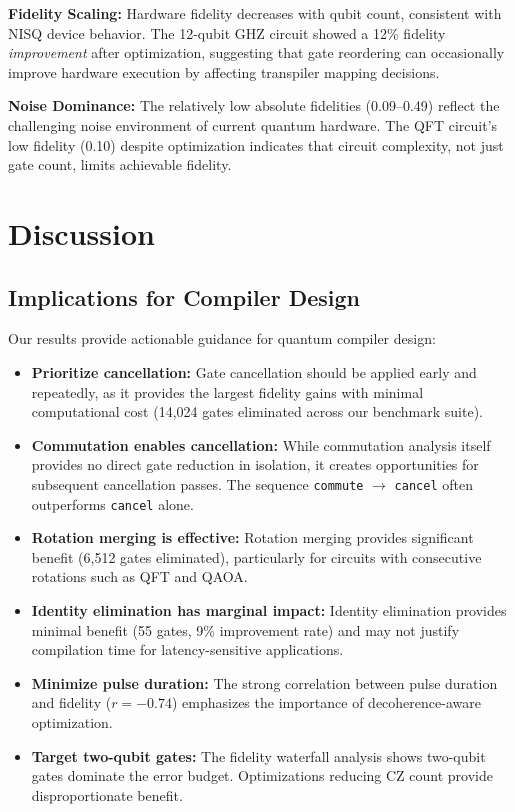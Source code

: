 \documentclass[journal]{IEEEtran}
\begin{document}
\textbf{Fidelity Scaling:} Hardware fidelity decreases with qubit count, consistent with NISQ device behavior. The 12-qubit GHZ circuit showed a 12\% fidelity \textit{improvement} after optimization, suggesting that gate reordering can occasionally improve hardware execution by affecting transpiler mapping decisions.

\textbf{Noise Dominance:} The relatively low absolute fidelities (0.09--0.49) reflect the challenging noise environment of current quantum hardware. The QFT circuit's low fidelity (0.10) despite optimization indicates that circuit complexity, not just gate count, limits achievable fidelity.

\section{Discussion}
\label{sec:discussion}

\subsection{Implications for Compiler Design}

Our results provide actionable guidance for quantum compiler design:

\begin{itemize}
    \item \textbf{Prioritize cancellation:} Gate cancellation should be applied early and repeatedly, as it provides the largest fidelity gains with minimal computational cost (14,024 gates eliminated across our benchmark suite).
    
    \item \textbf{Commutation enables cancellation:} While commutation analysis itself provides no direct gate reduction in isolation, it creates opportunities for subsequent cancellation passes. The sequence \texttt{commute} $\rightarrow$ \texttt{cancel} often outperforms \texttt{cancel} alone.
    
    \item \textbf{Rotation merging is effective:} Rotation merging provides significant benefit (6,512 gates eliminated), particularly for circuits with consecutive rotations such as QFT and QAOA.
    
    \item \textbf{Identity elimination has marginal impact:} Identity elimination provides minimal benefit (55 gates, 9\% improvement rate) and may not justify compilation time for latency-sensitive applications.
    
    \item \textbf{Minimize pulse duration:} The strong correlation between pulse duration and fidelity ($r = -0.74$) emphasizes the importance of decoherence-aware optimization.
    
    \item \textbf{Target two-qubit gates:} The fidelity waterfall analysis shows two-qubit gates dominate the error budget. Optimizations reducing CZ count provide disproportionate benefit.
\end{itemize}
\end{document}
